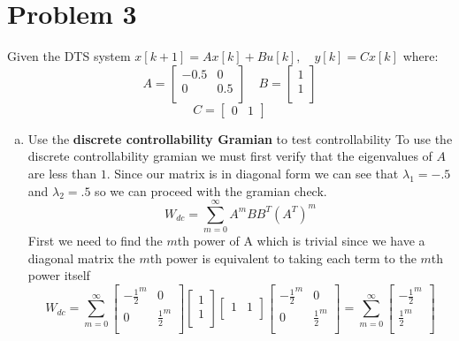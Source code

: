 \documentclass{article}
\begin{document}
\newpage
\section*{Problem 3}
Given the DTS system $x[k+1] = Ax[k] + Bu[k], \quad y[k] = Cx[k]$ where:
$$
A =
\begin{bmatrix}
-0.5 & 0 \\
0 & 0.5 \\
\end{bmatrix}
\quad
B =
\begin{bmatrix}
1 \\
1 \\
\end{bmatrix}
$$
$$ C = \begin{bmatrix} 0 & 1 \end{bmatrix} $$

\begin{enumerate}[a.]
\item Use the \textbf{discrete controllability Gramian} to test controllability
\newline
To use the discrete controllability gramian we must first verify that the eigenvalues of $A$ are less than $1$.
Since our matrix is in diagonal form we can see that $\lambda_1 = -.5$ and $\lambda_2 = .5$ so we can proceed with the gramian check.
$$W_{dc} = \sum_{m=0}^{\infty}A^mBB^T(A^T)^m$$
First we need to find the $m$th power of A which is trivial since we have a diagonal matrix the $m$th power is equivalent to taking each term to the $m$th power itself
$$W_{dc} = \sum_{m=0}^{\infty}
\begin{bmatrix}
-\frac{1}{2}^m & 0 \\
0 & \frac{1}{2}^m \\
\end{bmatrix}
\begin{bmatrix}
1 \\
1 \\
\end{bmatrix}
\begin{bmatrix} 1 & 1\\ \end{bmatrix}
\begin{bmatrix}
-\frac{1}{2}^m & 0 \\
0 & \frac{1}{2}^m \\
\end{bmatrix}
=\sum_{m=0}^{\infty}
\begin{bmatrix}
-\frac{1}{2}^m \\
 \frac{1}{2}^m \\

\end{bmatrix}$$
\end{enumerate}
\end{document}
